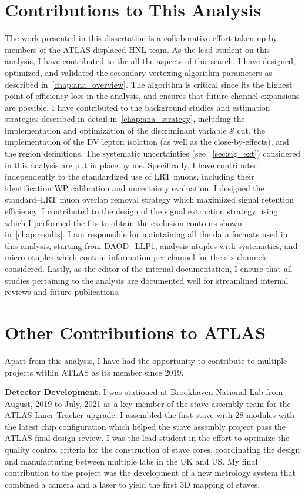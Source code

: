 \section*{Contributions to This Analysis}
The work presented in this dissertation is a collaborative effort taken up by members of the ATLAS displaced HNL team. As the lead student on this analysis, I have contributed to the all the aspects of this search. I have designed, optimized, and validated the secondary vertexing algorithm parameters as described in~\cref{chap:ana_overview}. The algorithm is critical since its the highest point of efficiency loss in the analysis, and ensures that future channel expansions are possible. I have contributed to the background studies and estimation strategies described in detail in~\cref{chap:ana_strategy}, including the implementation and optimization of the discriminant variable $\mathcal{S}$ cut, the implementation of the DV lepton isolation (as well as the close-by-effects), and the region definitions. The systematic uncertainties (see ~\cref{sec:sig_ext}) considered in this analysis are put in place by me. Specifically, I have contributed independently to the standardized use of LRT muons, including their identification WP calibration and uncertainty evaluation. I designed the standard--LRT muon overlap removal strategy which maximized signal retention efficiency. I contributed to the design of the signal extraction strategy using which I performed the fits to obtain the exclusion contours shown in~\cref{chap:results}. I am responsible for maintaining all the data formats used in this analysis, starting from DAOD\_LLP1, analysis ntuples with systematics, and micro-ntuples which contain information per channel for the six channels considered. Lastly, as the editor of the internal documentation, I ensure that all studies pertaining to the analysis are documented well for streamlined internal reviews and future publications.

\section*{Other Contributions to ATLAS}
Apart from this analysis, I have had the opportunity to contribute to multiple projects within ATLAS as its member since 2019.

\textbf{Detector Development}: I was stationed at Brookhaven National Lab from August, 2019 to July, 2021 as a key member of the stave assembly team for the ATLAS Inner Tracker upgrade. I assembled the first stave with 28 modules with the latest chip configuration which helped the stave assembly project pass the ATLAS final design review. I was the lead student in the effort to optimize the quality control criteria for the construction of stave cores, coordinating the design and manufacturing between multiple labs in the UK and US. My final contribution to the project was the development of a new metrology system that combined a camera and a laser to yield the first 3D mapping of staves.

